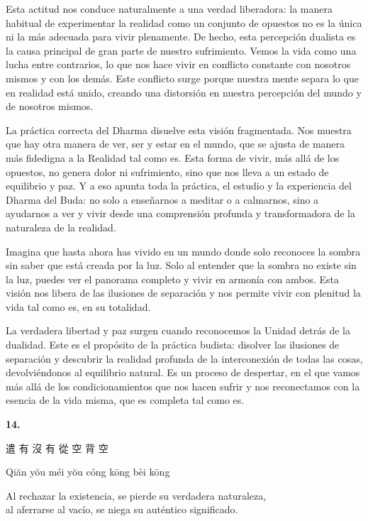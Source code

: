 \documentclass[
  a5paperpaper,
]{article}
\begin{document}
Esta actitud nos conduce naturalmente a una verdad liberadora: la manera
habitual de experimentar la realidad como un conjunto de opuestos no es
la única ni la más adecuada para vivir plenamente. De hecho, esta
percepción dualista es la causa principal de gran parte de nuestro
sufrimiento. Vemos la vida como una lucha entre contrarios, lo que nos
hace vivir en conflicto constante con nosotros mismos y con los demás.
Este conflicto surge porque nuestra mente separa lo que en realidad está
unido, creando una distorsión en nuestra percepción del mundo y de
nosotros mismos.

La práctica correcta del Dharma disuelve esta visión fragmentada. Nos
muestra que hay otra manera de ver, ser y estar en el mundo, que se
ajusta de manera más fidedigna a la Realidad tal como es. Esta forma de
vivir, más allá de los opuestos, no genera dolor ni sufrimiento, sino
que nos lleva a un estado de equilibrio y paz. Y a eso apunta toda la
práctica, el estudio y la experiencia del Dharma del Buda: no solo a
enseñarnos a meditar o a calmarnos, sino a ayudarnos a ver y vivir desde
una comprensión profunda y transformadora de la naturaleza de la
realidad.

Imagina que hasta ahora has vivido en un mundo donde solo reconoces la
sombra sin saber que está creada por la luz. Solo al entender que la
sombra no existe sin la luz, puedes ver el panorama completo y vivir en
armonía con ambos. Esta visión nos libera de las ilusiones de separación
y nos permite vivir con plenitud la vida tal como es, en su totalidad.

La verdadera libertad y paz surgen cuando reconocemos la Unidad detrás
de la dualidad. Este es el propósito de la práctica budista: disolver
las ilusiones de separación y descubrir la realidad profunda de la
interconexión de todas las cosas, devolviéndonos al equilibrio natural.
Es un proceso de despertar, en el que vamos más allá de los
condicionamientos que nos hacen sufrir y nos reconectamos con la esencia
de la vida misma, que es completa tal como es.

\hfill\break

\hypertarget{04}{}
\begin{verseblock}

\newpage

\begin{center}\textbf{14.}\end{center}

遣 有 沒 有 從 空 背 空

Qiăn yŏu méi yŏu cóng kōng bèi kōng

Al rechazar la existencia, se pierde su verdadera naturaleza,\\
al aferrarse al vacío, se niega su auténtico significado.

\end{verseblock}
\end{document}
